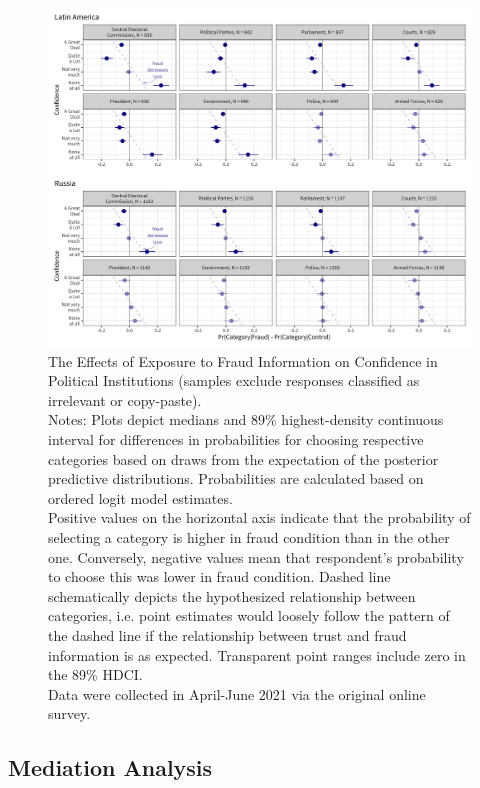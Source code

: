 \documentclass[11pt, ngerman,english,a4]{article}
\begin{document}
    \begin{figure}[H]
    \centering
    \includegraphics[width=\linewidth,trim=4 4 4 4,clip]{figs/main_hdi89_3.png}
    \caption{The Effects of Exposure to Fraud Information on Confidence in Political Institutions (samples exclude responses classified as irrelevant or copy-paste).  \\
     \footnotesize{Notes: Plots depict medians and 89\% highest-density continuous interval for differences in probabilities for choosing respective categories based on draws from the expectation of the posterior predictive distributions. Probabilities are calculated based on ordered logit model estimates.\\
     Positive values on the horizontal axis indicate that the probability of selecting a category is higher in fraud condition than in the other one. Conversely, negative values mean that respondent's probability to choose this was lower in fraud condition. Dashed line schematically depicts the hypothesized relationship between categories, i.e. point estimates would loosely follow the pattern of the dashed line if the relationship between trust and fraud information is as expected. Transparent point ranges include zero in the 89\% HDCI.\\
     Data were collected in April-June 2021 via the original online survey. } }
    \singlespacing
    \raggedright
    
    \label{fig:main-3}
    \end{figure}
    
    
\clearpage
\subsection*{Mediation Analysis}
\end{document}
